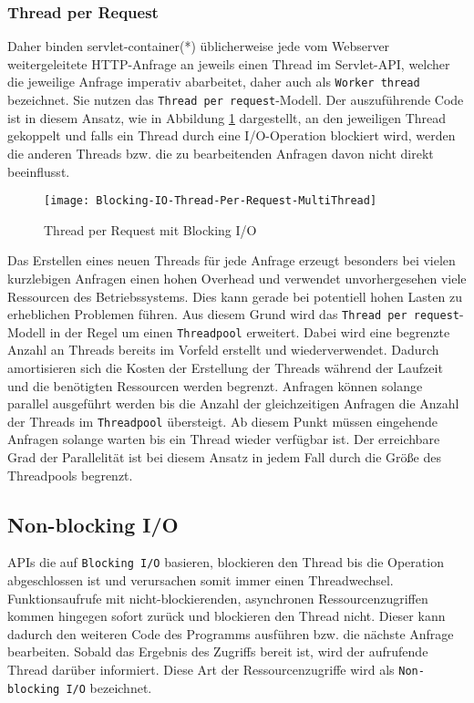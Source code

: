 \subsubsection{Thread per Request}
\label{subsubsec:thread per request}
Daher binden \Gls{servlet-container}(*) üblicherweise jede vom Webserver weitergeleitete HTTP-Anfrage an jeweils einen
Thread im Servlet-API, welcher die jeweilige Anfrage imperativ abarbeitet, daher auch als \verb|Worker thread| bezeichnet.
Sie nutzen das \verb|Thread per request|-Modell.
Der auszuführende Code ist in diesem Ansatz, wie in Abbildung \ref{fig:blocking_thread_per_request} dargestellt,
an den jeweiligen Thread gekoppelt und falls ein Thread durch eine I/O-Operation blockiert wird, werden
die anderen Threads bzw. die zu bearbeitenden Anfragen davon nicht direkt beeinflusst.
\begin{figure}[ht!]
  \centering
  \texttt{[image: Blocking-IO-Thread-Per-Request-MultiThread]}
  \caption{Thread per Request mit Blocking I/O}
  \label{fig:blocking_thread_per_request}
\end{figure}

Das Erstellen eines neuen Threads für jede Anfrage erzeugt besonders bei vielen kurzlebigen Anfragen einen hohen Overhead und
verwendet unvorhergesehen viele Ressourcen des Betriebssystems. Dies kann gerade bei potentiell hohen Lasten zu erheblichen Problemen
führen.
Aus diesem Grund wird das \verb|Thread per request|-Modell in der Regel um einen \verb|Threadpool| erweitert.
Dabei wird eine begrenzte Anzahl an Threads bereits im Vorfeld erstellt und wiederverwendet.
Dadurch amortisieren sich die Kosten der Erstellung der Threads während der Laufzeit und die benötigten Ressourcen werden begrenzt.
Anfragen können solange parallel ausgeführt werden bis die Anzahl der gleichzeitigen Anfragen die Anzahl der Threads im \verb|Threadpool|
übersteigt.
Ab diesem Punkt müssen eingehende Anfragen solange warten bis ein Thread wieder verfügbar ist.
Der erreichbare Grad der Parallelität ist bei diesem Ansatz in jedem Fall durch die Größe des Threadpools begrenzt.
\newpage
\subsection{Non-blocking I/O}
\label{subsec:nonblocking-i/o}
APIs die auf \verb|Blocking I/O| basieren, blockieren den Thread bis die Operation abgeschlossen ist und verursachen somit
immer einen Threadwechsel.
Funktionsaufrufe mit nicht-blockierenden, asynchronen Ressourcenzugriffen kommen hingegen sofort zurück und blockieren den Thread nicht.
Dieser kann dadurch den weiteren Code des Programms ausführen bzw. die nächste Anfrage bearbeiten.
Sobald das Ergebnis des Zugriffs bereit ist, wird der aufrufende Thread darüber informiert.
Diese Art der Ressourcenzugriffe wird als \verb|Non-blocking I/O| bezeichnet.

